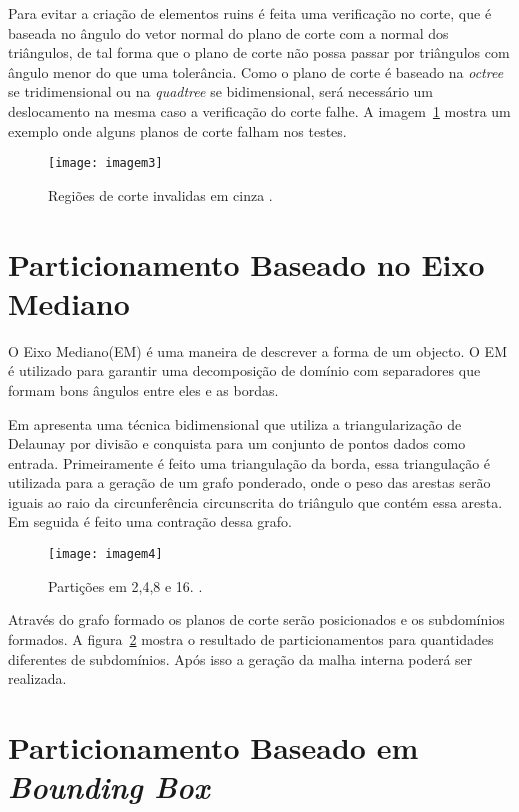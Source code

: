Para evitar a criação de elementos ruins é feita uma verificação no corte, que é baseada no ângulo do vetor normal do plano de corte com a normal dos triângulos, de tal forma que o plano de corte não possa passar por triângulos com ângulo menor do que uma tolerância. Como o plano de corte é baseado na \textit{octree} se tridimensional ou na \textit{quadtree} se bidimensional, será necessário um deslocamento na mesma caso a verificação do corte falhe. A imagem~\ref{fig:imagem3} mostra um exemplo onde alguns planos de corte falham nos testes.

 \begin{figure}[htbp]
     \centering
     \texttt{[image: imagem3]}
     \caption{Regiões de corte invalidas em cinza \cite{bib:Larwood03}.}
     \label{fig:imagem3}
 \end{figure}

\section{Particionamento Baseado no Eixo Mediano}

O Eixo Mediano(EM) é uma maneira de descrever a forma de um objecto. O EM é utilizado para garantir uma decomposição de domínio com separadores que formam bons ângulos entre eles e as bordas. 

Em \cite{bib:Leonidas06} apresenta uma técnica bidimensional que utiliza a triangularização de Delaunay por divisão e conquista para um conjunto de pontos dados como entrada. Primeiramente é feito uma triangulação da borda, essa triangulação é utilizada para a geração de um grafo ponderado, onde o peso das arestas serão iguais ao raio da circunferência circunscrita do triângulo que contém essa aresta. Em seguida é feito uma contração dessa grafo. 

 \begin{figure}[htbp]
     \centering
     \texttt{[image: imagem4]}
     \caption{Partições em 2,4,8 e 16. \cite{bib:Leonidas06}.}
     \label{fig:imagem4}
 \end{figure}

Através do grafo formado os planos de corte serão posicionados e os subdomínios formados. A figura~\ref{fig:imagem4} mostra o resultado de particionamentos para quantidades diferentes de subdomínios. Após isso a geração da malha interna poderá ser realizada.

\section{Particionamento Baseado em \textit{Bounding Box}}

